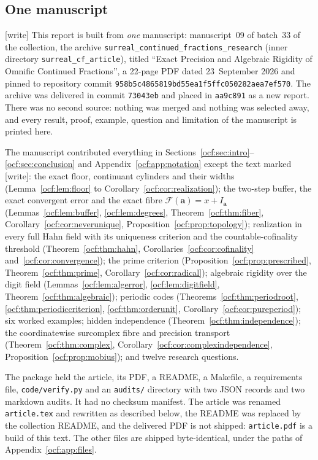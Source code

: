 \documentclass[11pt,a4paper]{article}
\numberwithin{equation}{section}
\theoremstyle{definition}
\theoremstyle{remark}
\newcommand{\F}{\mathcal F}
\newcommand{\codea}{\boldsymbol a}
\newcommand{\rpath}[1]{\nolinkurl{#1}}%
\newcommand{\wtag}{\textup{[write]}}%
\begin{document}
\subsection{One manuscript}\label{ocf:app:onesource}

\wtag{} This report is built from \emph{one} manuscript: manuscript~09 of
batch~33 of the collection, the archive
\texttt{surreal\_continued\_fractions\_research} (inner directory
\texttt{surreal\_cf\_article}), titled ``Exact Precision and Algebraic
Rigidity of Omnific Continued Fractions'', a 22-page PDF dated
23~September 2026 and pinned to repository commit
\nolinkurl{958b5c4865819bd55ea1f5ffc050282aea7ef570}. The archive was
delivered in commit \texttt{73043eb} and placed in \texttt{aa9c891} as a
new report. There was no second source: nothing was merged and nothing was
selected away, and every result, proof, example, question and limitation of
the manuscript is printed here.

The manuscript contributed everything in
Sections~\ref{ocf:sec:intro}--\ref{ocf:sec:conclusion} and
Appendix~\ref{ocf:app:notation} except the text marked \wtag: the exact
floor, continuant cylinders and their widths
(Lemma~\ref{ocf:lem:floor} to Corollary~\ref{ocf:cor:realization}); the
two-step buffer, the exact convergent error and the exact fibre
$\F(\codea)=x+I_{\codea}$ (Lemmas~\ref{ocf:lem:buffer},
\ref{ocf:lem:degrees}, Theorem~\ref{ocf:thm:fiber},
Corollary~\ref{ocf:cor:neverunique}, Proposition~\ref{ocf:prop:topology});
realization in every full Hahn field with its uniqueness criterion and the
countable-cofinality threshold (Theorem~\ref{ocf:thm:hahn},
Corollaries~\ref{ocf:cor:cofinality} and~\ref{ocf:cor:convergence}); the
prime criterion (Proposition~\ref{ocf:prop:prescribed},
Theorem~\ref{ocf:thm:prime}, Corollary~\ref{ocf:cor:radical}); algebraic
rigidity over the digit field (Lemmas~\ref{ocf:lem:algerror},
\ref{ocf:lem:digitfield}, Theorem~\ref{ocf:thm:algebraic}); periodic codes
(Theorems~\ref{ocf:thm:periodroot}, \ref{ocf:thm:periodiccriterion},
\ref{ocf:thm:orderunit}, Corollary~\ref{ocf:cor:pureperiod}); six worked
examples; hidden independence (Theorem~\ref{ocf:thm:independence}); the
coordinatewise surcomplex fibre and precision transport
(Theorem~\ref{ocf:thm:complex}, Corollary~\ref{ocf:cor:complexindependence},
Proposition~\ref{ocf:prop:mobius}); and twelve research questions.

The package held the article, its PDF, a README, a Makefile, a
requirements file, \texttt{code/verify.py} and an \texttt{audits/}
directory with two JSON records and two markdown audits. It had no checksum
manifest. The article was renamed \rpath{article.tex} and rewritten as
described below, the README was replaced by the collection README, and the
delivered PDF is not shipped: \rpath{article.pdf} is a build of this text.
The other files are shipped byte-identical, under the paths of
Appendix~\ref{ocf:app:files}.
\end{document}
